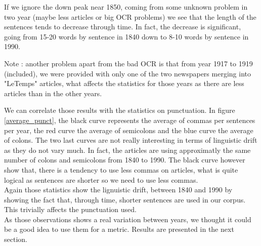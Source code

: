 If we ignore the down peak near 1850, coming from some unknown problem in two year (maybe less articles or big OCR problems) we see that the length of the sentences tends to decrease through time. In fact, the decrease is significant, going from 15-20 words by sentence in 1840 down to 8-10 words by sentence in 1990.

Note : another problem apart from the bad OCR is that from year 1917 to 1919 (included), we were provided with only one of the two newspapers merging into "LeTemps" articles, what affects the statistics for those years as there are less articles than in the other years.

We can correlate those results with the statistics on punctuation. In figure \ref{average_punct}, the black curve represents the average of commas per sentences per year, the red curve the average of semicolons and the blue curve the average of colons. The two last curves are not really interesting in terms of linguistic drift as they do not vary much. In fact, the articles are using approximatly the same number of colons and semicolons from 1840 to 1990. The black curve however show that, there is a tendency to use less commas on articles, what is quite logical as sentences are shorter so we need to use less commas.\\

Again those statistics show the lignuistic drift, between 1840 and 1990 by showing the fact that, through time, shorter sentences are used in our corpus. This trivially affects the punctuation used. \\

As those observations shows a real variation between years, we thought it could be a good idea to use them for a metric. Results are presented in the next section.
